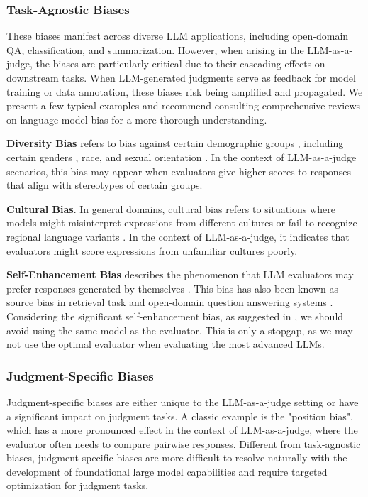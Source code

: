 \subsubsection{\textbf{Task-Agnostic Biases}}
\label{Evaluation:Task-Agnostic Biases}
These biases manifest across diverse LLM applications, including open-domain QA, classification, and summarization.
However, when arising in the LLM-as-a-judge, the biases are particularly critical due to their cascading effects on downstream tasks. 
When LLM-generated judgments serve as feedback for model training or data annotation, these biases risk being amplified and propagated.
We present a few typical examples and recommend consulting comprehensive reviews on language model bias \citep{llm_bias,llm_bias_2} for a more thorough understanding.

\textbf{Diversity Bias} refers to bias against certain demographic groups \cite{ye2024justice},  including certain genders \cite{chen2024humans}, race, and sexual orientation \cite{kumar2024subtle}.
In the context of LLM-as-a-judge scenarios, this bias may appear when evaluators give higher scores to responses that align with stereotypes of certain groups.

\textbf{Cultural Bias}. In general domains, cultural bias refers to situations where models might misinterpret expressions from different cultures or fail to recognize regional language variants \citep{llm_bias}. In the context of LLM-as-a-judge, it indicates that evaluators might score expressions from unfamiliar cultures poorly.


\textbf{Self-Enhancement Bias} describes the phenomenon that LLM evaluators may prefer responses generated by themselves \cite{nips_llm_as_a_judge,ye2024justice}.
This bias has also been known as source bias in retrieval task \citep{sourcebias} and open-domain question answering systems \citep{tan-etal-2024-blinded}.
Considering the significant self-enhancement bias, as suggested in \cite{ye2024justice}, we should avoid using the same model as the evaluator.
This is only a stopgap, as we may not use the optimal evaluator when evaluating the most advanced LLMs.




\subsubsection{\textbf{Judgment-Specific Biases}}
\label{Evaluation:Judgment-Specific Biases}
Judgment-specific biases are either unique to the LLM-as-a-judge setting or have a significant impact on judgment tasks. 
A classic example is the "position bias", which has a more pronounced effect in the context of LLM-as-a-judge, where the evaluator often needs to compare pairwise responses.
Different from task-agnostic biases, judgment-specific biases are more difficult to resolve naturally with the development of foundational large model capabilities and require targeted optimization for judgment tasks.



